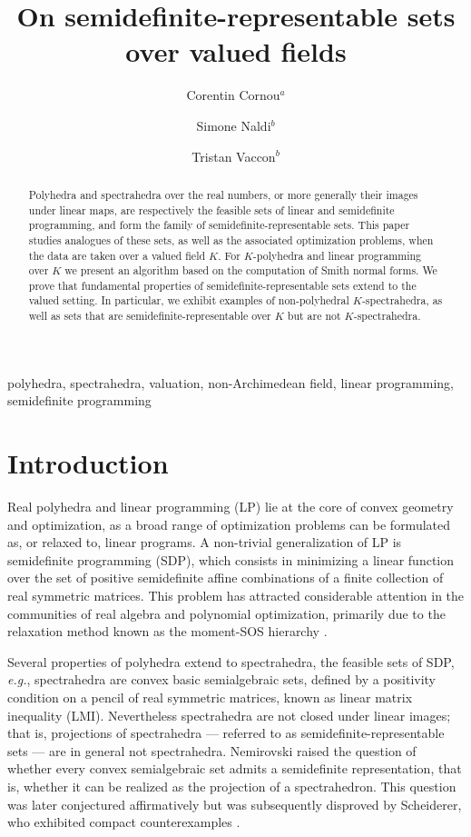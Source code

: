 \documentclass{elsarticle}
\author{Corentin Cornou$^a$}
\affiliation{
    organization={ENS Paris-Saclay},
    city={Gif-sur-Yvette},
    country={France}
}
\author{Simone Naldi$^b$}
\author{Tristan Vaccon$^b$}
\affiliation{
    organization={Université de Limoges, CNRS, XLIM},
    city={Limoges},
    country={France}
}
\theoremstyle{plain}
\theoremstyle{definition}
\begin{document}
\title{On semidefinite-representable sets over valued fields}

\begin{abstract}
  Polyhedra and spectrahedra over the real numbers, or more generally
  their images under linear maps, are respectively the feasible sets
  of linear and semidefinite
  programming, and form the family of semidefinite-representable sets.
  This paper studies analogues of these sets, as well as
  the associated optimization problems, when the data are taken over a valued 
  field $K$.
  For $K$-polyhedra and linear programming over $K$ we present an algorithm
  based on the computation of Smith normal forms.
  We prove that fundamental properties of semidefinite-representable sets extend
  to the valued setting.
  In particular, we exhibit examples of non-polyhedral $K$-spectrahedra, as well as
 sets that are semidefinite-representable over $K$ but are not $K$-spectrahedra.
\end{abstract}

\begin{keyword}
  polyhedra, spectrahedra, valuation, non-Archimedean field, linear programming, semidefinite programming
\end{keyword}

\maketitle

\section{Introduction}
\label{sec:intro}

Real polyhedra and linear programming (LP) lie at the core
of convex geometry and optimization, as a broad range
of optimization problems can be formulated as, or relaxed to, linear programs.
A non-trivial generalization of LP is semidefinite programming (SDP),
which consists in minimizing a linear function over the set of
positive semidefinite affine combinations of a finite collection of
real symmetric matrices.
This problem has attracted considerable attention in the
communities of real algebra and polynomial optimization,
primarily due to the relaxation method known as the moment-SOS hierarchy
\cite{henrion2020moment}.

Several properties of polyhedra extend to spectrahedra, the feasible
sets of SDP, {\it e.g.}, spectrahedra are convex basic semialgebraic sets,
defined by a positivity condition on a pencil of real symmetric matrices,
known as linear matrix inequality (LMI).
Nevertheless spectrahedra are not closed under linear images; that is,
projections of spectrahedra --- referred to as semidefinite-representable sets ---
are in general not spectrahedra. Nemirovski
\cite{nemirovski2007advances} raised the question of whether every convex semialgebraic set admits
a semidefinite representation, that is, whether it can be realized as the projection
of a spectrahedron. This question was later conjectured affirmatively \cite{helton_sufficient_2008} 
but was subsequently disproved by Scheiderer, who
exhibited compact counterexamples \cite{scheiderer_spectrahedral_2017}.
\end{document}
